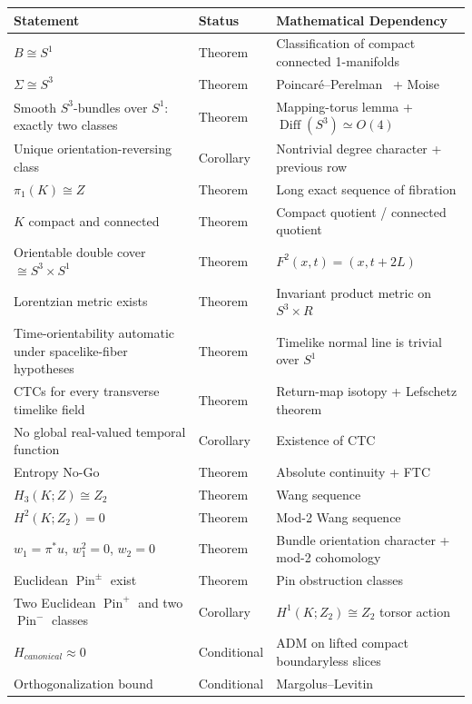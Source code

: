 \documentclass[11pt]{article}
\theoremstyle{canonmath}
\theoremstyle{canonpostulate}
\theoremstyle{canonproposition}
\providecommand{\Klein}{\mathcal{K}}
\providecommand{\R}{\mathbb{R}}
\providecommand{\Z}{\mathbb{Z}}
\providecommand{\Ztwo}{\mathbb{Z}_2}
\providecommand{\Sone}{S^1}
\providecommand{\Sthree}{S^3}
\providecommand{\Diff}{\operatorname{Diff}}
\providecommand{\Pin}{\operatorname{Pin}}
\def\mathrm#1{#1}%
\def\mathbb#1{#1}%
\def\mathcal#1{#1}%
\begin{document}
\begin{longtable}{>{\raggedright\arraybackslash}p{} >{\raggedright\arraybackslash}p{} >{\raggedright\arraybackslash}p{}}
\toprule
\textbf{Statement} & \textbf{Status} & \textbf{Mathematical Dependency} \\
\midrule
$B\cong\Sone$ & Theorem & Classification of compact connected 1-manifolds \\
$\Sigma\cong\Sthree$ & Theorem & Poincar\'e--Perelman~\cite{perelman,perelmanSurgery,perelmanExtinction} + Moise~\cite{moise} \\
Smooth $\Sthree$-bundles over $\Sone$: exactly two classes & Theorem & Mapping-torus lemma + $\Diff(\Sthree)\simeq O(4)$~\cite{hatcher} \\
Unique orientation-reversing class & Corollary & Nontrivial degree character + previous row \\
$\pi_1(\Klein)\cong\Z$ & Theorem & Long exact sequence of fibration \\
$\Klein$ compact and connected & Theorem & Compact quotient / connected quotient \\
Orientable double cover $\cong\Sthree\times\Sone$ & Theorem & $F^2(x,t)=(x,t+2L)$ \\
Lorentzian metric exists & Theorem & Invariant product metric on $\Sthree\times\R$ \\
Time-orientability automatic under spacelike-fiber hypotheses & Theorem & Timelike normal line is trivial over $\Sone$ \\
CTCs for every transverse timelike field & Theorem & Return-map isotopy + Lefschetz theorem \\
No global real-valued temporal function & Corollary & Existence of CTC \\
Entropy No-Go & Theorem & Absolute continuity + FTC \\
$H_3(\Klein;\Z)\cong\Ztwo$ & Theorem & Wang sequence \\
$H^2(\Klein;\Ztwo)=0$ & Theorem & Mod-2 Wang sequence \\
$w_1=\pi^*u$, $w_1^2=0$, $w_2=0$ & Theorem & Bundle orientation character + mod-2 cohomology \\
Euclidean $\Pin^\pm$ exist & Theorem & Pin obstruction classes~\cite{kirby} \\
Two Euclidean $\Pin^+$ and two $\Pin^-$ classes & Corollary & $H^1(\Klein;\Ztwo)\cong\Ztwo$ torsor action \\
$H_{\mathrm{canonical}}\approx0$ & Conditional & ADM on lifted compact boundaryless slices~\cite{wald,adm} \\
Orthogonalization bound & Conditional & Margolus--Levitin~\cite{margolus} \\
\bottomrule
\end{longtable}
\end{document}
